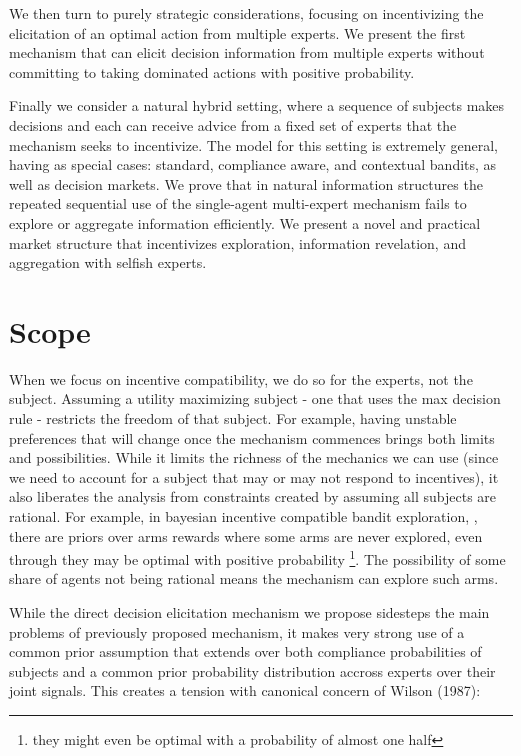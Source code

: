 We then turn to purely strategic considerations, focusing on incentivizing the elicitation of an optimal action from multiple experts.
We present the first mechanism that can elicit decision information from multiple experts without committing to taking dominated actions with positive probability. 

Finally we consider a natural hybrid setting, where a sequence of subjects makes decisions and each can receive advice from a fixed set of experts that the mechanism seeks to incentivize.
The model for this setting is extremely general, having as special cases: standard, compliance aware, and contextual bandits, as well as decision markets.
We prove that in natural information structures the repeated sequential use of the single-agent multi-expert mechanism fails to explore or aggregate information efficiently.
We present a novel and practical market structure that incentivizes exploration, information revelation, and aggregation with selfish experts.


\section{Scope}

When we focus on incentive compatibility, we do so for the experts, not the subject.
Assuming a utility maximizing subject - one that uses the max decision rule - restricts the freedom of that subject.
For example, having unstable preferences that will change once the mechanism commences brings both limits and possibilities.
While it limits the richness of the mechanics we can use (since we need to account for a subject that may or may not respond to incentives), it also liberates the analysis from constraints created by assuming all subjects are rational. 
For example, in bayesian incentive compatible bandit exploration, \cite{mansour2015bayesian}, there are priors over arms rewards where some arms are never explored, even through they may be optimal with positive probability \footnote{they might even be optimal with a probability of almost one half}. The possibility of some share of agents not being rational means the mechanism can explore such arms.

While the direct decision elicitation mechanism we propose sidesteps the main problems of previously proposed mechanism, it makes very strong use of a common prior assumption that extends over both compliance probabilities of subjects and a common prior probability distribution accross experts over their joint signals. This creates a tension with canonical concern of Wilson (1987):


